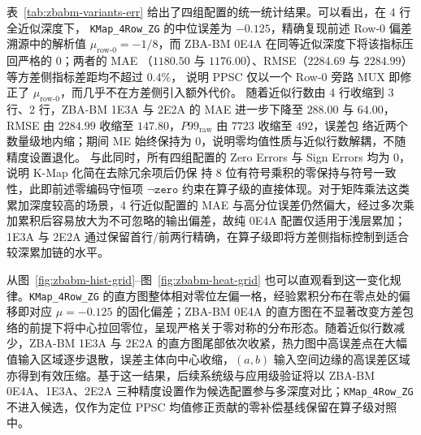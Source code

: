 \documentclass[12pt,a4paper,UTF8]{article}
\begin{document}
表~\ref{tab:zbabm-variants-err} 给出了四组配置的统一统计结果。可以看出，在 4 行全近似深度下，
\texttt{KMap\_4Row\_ZG} 的中位误差为 $-0.125$，精确复现前述 Row-0 偏差溯源中的解析值 $\mu_
{\text{row-0}}=-1/8$，而 ZBA-BM 0E4A 在同等近似深度下将该指标压回严格的 $0$；两者的 MAE
（$1180.50$ 与 $1176.00$）、RMSE（$2284.69$ 与 $2284.99$）等方差侧指标差距均不超过 $0.4\%$，
说明 PPSC 仅以一个 Row-0 旁路 MUX 即修正了 $\mu_{\text{row-0}}$，而几乎不在方差侧引入额外代价。
随着近似行数由 4 行收缩到 3 行、2 行，ZBA-BM 1E3A 与 2E2A 的 MAE 进一步下降至 $288.00$ 与 $64.00$，
RMSE 由 $2284.99$ 收缩至 $147.80$，$P99_{\mathrm{raw}}$ 由 $7723$ 收缩至 $492$，误差包
络近两个数量级地内缩；期间 ME 始终保持为 $0$，说明零均值性质与近似行数解耦，不随精度设置退化。
与此同时，所有四组配置的 Zero Errors 与 Sign Errors 均为 $0$，说明 K-Map 化简在去除冗余项后仍保
持 8 位有符号乘积的零保持与符号一致性，此即前述零编码守恒项 $\neg\mathtt{zero}$ 约束在算子级的直接体现。对于矩阵乘法这类累加深度较高的场景，4 行近似配置的 MAE 与高分位误差仍然偏大，经过多次乘加累积后容易放大为不可忽略的输出偏差，故纯 0E4A 配置仅适用于浅层累加；1E3A 与 2E2A 通过保留首行/前两行精确，在算子级即将方差侧指标控制到适合较深累加链的水平。

从图~\ref{fig:zbabm-hist-grid}--图~\ref{fig:zbabm-heat-grid} 也可以直观看到这一变化规律。\texttt{KMap\_4Row\_ZG} 的直方图整体相对零位左偏一格，经验累积分布在零点处的偏移即对应 $\mu=-0.125$ 的固化偏差；ZBA-BM 0E4A 的直方图在不显著改变方差包络的前提下将中心拉回零位，呈现严格关于零对称的分布形态。随着近似行数减少，ZBA-BM 1E3A 与 2E2A 的直方图尾部依次收紧，热力图中高误差点在大幅值输入区域逐步退散，误差主体向中心收缩，$(a,b)$ 输入空间边缘的高误差区域亦得到有效压缩。基于这一结果，后续系统级与应用级验证将以 ZBA-BM 0E4A、1E3A、2E2A 三种精度设置作为候选配置参与多深度对比；\texttt{KMap\_4Row\_ZG} 不进入候选，仅作为定位 PPSC 均值修正贡献的零补偿基线保留在算子级对照中。
\end{document}
